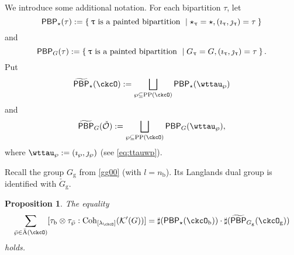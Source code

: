 \documentclass[12pt,a4paper]{amsart}
\newcommand{\CK}{{\mathcal {K}}}
\newcommand{\CO}{{\mathcal {O}}}
\numberwithin{equation}{section}
\newtheorem{prop}[thm]{Proposition}
\theoremstyle{remark}
\def\Unip{\mathrm{Unip}}
\def\LC{{}^{\scriptscriptstyle L}\sC}
\def\Coh{\mathrm{Coh}}
\def\CPP{\mathrm{PP}}
\def\tPBP{\widetilde{\mathsf{PBP}}}
\def\PBP{\mathsf{PBP}}
\def\ckcOg{\ckcO_{\mathrm g}}
\def\nnb{n_{\mathrm b}}
\def\tPBP{\widetilde{\mathsf{PBP}}}
\begin{document}
 
 We introduce some additional notation. For each bipartition $\tau$, let
\[
  \PBP_{\star}(\tau) := \Set{ \uptau \text{ is a painted bipartition }\mid  \star_{\uptau}=\star, (\imath_{\uptau},\jmath_{\uptau}) = \tau}
\]
and
\[
  \PBP_{G}(\tau) := \Set{\uptau \text{ is a painted bipartition }\mid G_{\uptau}=G, (\imath_{\uptau},\jmath_{\uptau}) = \tau}.
\]
Put
\[
  \tPBP_{\star}(\ckcO) := %
  \bigsqcup_{\wp \subseteq \CPP(\ckcO)}\PBP_{\star}(\wttau_{\wp})
\]
and
\[
  \tPBP_{G}(\check \CO):=   \bigsqcup_{\wp \subseteq \CPP(\ckcO)}\PBP_{G}(\wttau_{\wp}),
 \] 
where $\wttau_{\wp} := (\imath_{\wp},\jmath_{\wp})$ (see \eqref{eq:ttauwp}). 


Recall the group $G_\mathrm g$ from \eqref{gg00} (with $l=\nnb$).  Its Langlands dual group is identified with $\check G_\mathrm g$. 

\begin{prop}\label{prop:countBCD}
 The equality
  \[
  \sum_{\bar \wp\in \bar{\mathrm A}(\ckcO)} [\tau_{\mathrm b}\otimes \tau_{\bar \wp}: \Coh_{[\lambda_{\ckcO}]} (\CK'(G))]
      = \sharp (\PBP_{\star}(\ckcO_{\mathrm b}))\cdot \sharp(\tPBP_{G_{\mathrm g}}(\ckcO_{\mathrm g}))
  \]
  holds. 
 \end{prop}
\end{document}
